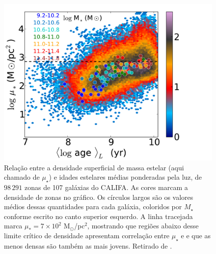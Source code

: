 \begin{figure}
  \includegraphics[scale=0.85]{figuras/Fig_age_McorSD_zonas_Bgsd01.pdf}
  \caption[$\log \mu_\star\ \times$ ]
  {Relação entre a densidade superficial de massa estelar (aqui chamado de $\mu_\star$) e idades estelares médias ponderadas pela luz,  de $98\,291$ zonas de 107 galáxias do CALIFA. As cores marcam a densidade de zonas no gráfico. Os círculos largos são os valores médios dessas quantidades para cada galáxia, coloridos por $M_\star$ conforme escrito no canto superior esquerdo. A linha tracejada marca $\mu_* = 7 \times 10^2$ M$_\odot$/pc$^2$, mostrando que regiões abaixo desse limite crítico de densidade apresentam correlação entre $\mu_\star$ e  e que as menos densas são também as mais jovens. Retirado de \citet{GonzalezDelgado.etal.2014a}.}
  \label{fig:Age_McorSD_zonas}
\end{figure}

